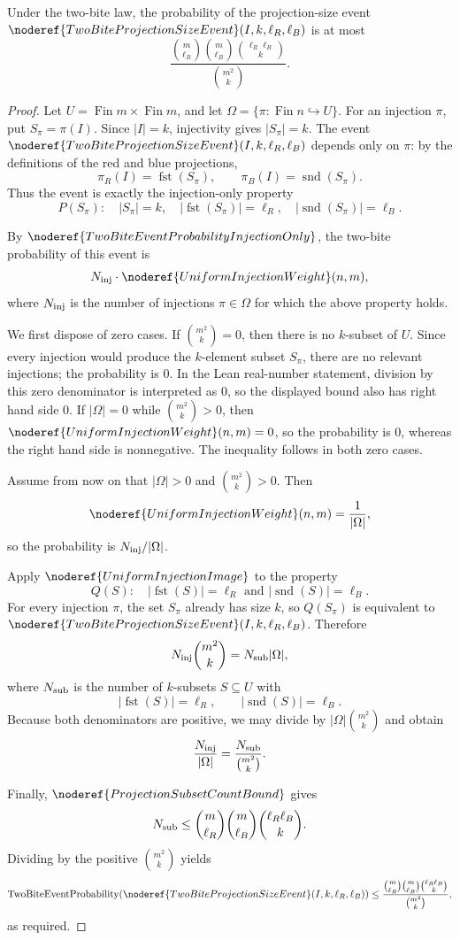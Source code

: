 \begin{helper}
Under the two-bite law, the probability of the projection-size event \(\noderef{TwoBiteProjectionSizeEvent}(I,k,\ell_R,\ell_B)\) is at most
\[
\frac{\binom{m}{\ell_R}\binom{m}{\ell_B}\binom{\ell_R\ell_B}{k}}{\binom{m^2}{k}}.
\]
\end{helper}
\begin{proof}
Let \(U=\operatorname{Fin}m\times\operatorname{Fin}m\), and let
\(\Omega=\{\pi:\operatorname{Fin}n\hookrightarrow U\}\).  For an injection
\(\pi\), put \(S_\pi=\pi(I)\).  Since \(|I|=k\), injectivity gives
\(|S_\pi|=k\).  The event
\(\noderef{TwoBiteProjectionSizeEvent}(I,k,\ell_R,\ell_B)\) depends only on
\(\pi\): by the definitions of the red and blue projections,
\[
\pi_R(I)=\operatorname{fst}(S_\pi),\qquad
\pi_B(I)=\operatorname{snd}(S_\pi).
\]
Thus the event is exactly the injection-only property
\[
P(S_\pi):\quad
|S_\pi|=k,\quad |\operatorname{fst}(S_\pi)|=\ell_R,\quad
|\operatorname{snd}(S_\pi)|=\ell_B.
\]

By \(\noderef{TwoBiteEventProbabilityInjectionOnly}\), the two-bite
probability of this event is
\[
N_{\rm inj}\cdot \noderef{UniformInjectionWeight}(n,m),
\]
where \(N_{\rm inj}\) is the number of injections \(\pi\in\Omega\) for which
the above property holds.

We first dispose of zero cases.  If \(\binom{m^2}{k}=0\), then there is no
\(k\)-subset of \(U\).  Since every injection would produce the
\(k\)-element subset \(S_\pi\), there are no relevant injections; the
probability is \(0\).  In the Lean real-number statement, division by this
zero denominator is interpreted as \(0\), so the displayed bound also has
right hand side \(0\).  If \(|\Omega|=0\) while \(\binom{m^2}{k}>0\), then
\(\noderef{UniformInjectionWeight}(n,m)=0\), so the probability is \(0\),
whereas the right hand side is nonnegative.  The inequality follows in both
zero cases.

Assume from now on that \(|\Omega|>0\) and \(\binom{m^2}{k}>0\).  Then
\[
\noderef{UniformInjectionWeight}(n,m)=\frac1{|\Omega|},
\]
so the probability is \(N_{\rm inj}/|\Omega|\).

Apply \(\noderef{UniformInjectionImage}\) to the property
\[
Q(S):\quad |\operatorname{fst}(S)|=\ell_R
\text{ and }|\operatorname{snd}(S)|=\ell_B.
\]
For every injection \(\pi\), the set \(S_\pi\) already has size \(k\), so
\(Q(S_\pi)\) is equivalent to
\(\noderef{TwoBiteProjectionSizeEvent}(I,k,\ell_R,\ell_B)\).  Therefore
\[
N_{\rm inj}\binom{m^2}{k}
=N_{\rm sub}|\Omega|,
\]
where \(N_{\rm sub}\) is the number of \(k\)-subsets
\(S\subseteq U\) with
\[
|\operatorname{fst}(S)|=\ell_R,\qquad
|\operatorname{snd}(S)|=\ell_B.
\]
Because both denominators are positive, we may divide by
\(|\Omega|\binom{m^2}{k}\) and obtain
\[
\frac{N_{\rm inj}}{|\Omega|}
=\frac{N_{\rm sub}}{\binom{m^2}{k}}.
\]

Finally, \(\noderef{ProjectionSubsetCountBound}\) gives
\[
N_{\rm sub}\le
\binom{m}{\ell_R}\binom{m}{\ell_B}\binom{\ell_R\ell_B}{k}.
\]
Dividing by the positive \(\binom{m^2}{k}\) yields
\[
\operatorname{TwoBiteEventProbability}
(\noderef{TwoBiteProjectionSizeEvent}(I,k,\ell_R,\ell_B))
\le
\frac{\binom{m}{\ell_R}\binom{m}{\ell_B}\binom{\ell_R\ell_B}{k}}
{\binom{m^2}{k}},
\]
as required.
\end{proof}
